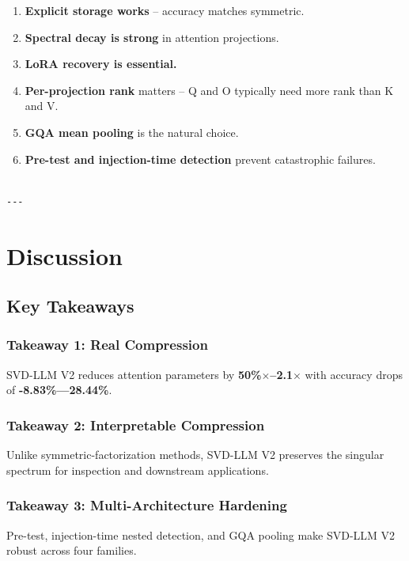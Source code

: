\begin{enumerate}
\item \textbf{Explicit storage works} -- accuracy matches symmetric.
\item \textbf{Spectral decay is strong} in attention projections.
\item \textbf{LoRA recovery is essential.}
\item \textbf{Per-projection rank} matters -- Q and O typically need more rank than K and V.
\item \textbf{GQA mean pooling} is the natural choice.
\item \textbf{Pre-test and injection-time detection} prevent catastrophic failures.
\end{enumerate}
\begin{lstlisting}

---
\end{lstlisting}


\section{Discussion}

\subsection{Key Takeaways}

\subsubsection{Takeaway 1: Real Compression}

SVD-LLM V2 reduces attention parameters by \textbf{50\%$\times$--2.1$\times$} with 
accuracy drops of \textbf{-8.83\%---28.44\%}.

\subsubsection{Takeaway 2: Interpretable Compression}

Unlike symmetric-factorization methods, SVD-LLM V2 preserves the singular 
spectrum for inspection and downstream applications.

\subsubsection{Takeaway 3: Multi-Architecture Hardening}

Pre-test, injection-time nested detection, and GQA pooling make SVD-LLM V2 
robust across four families.


